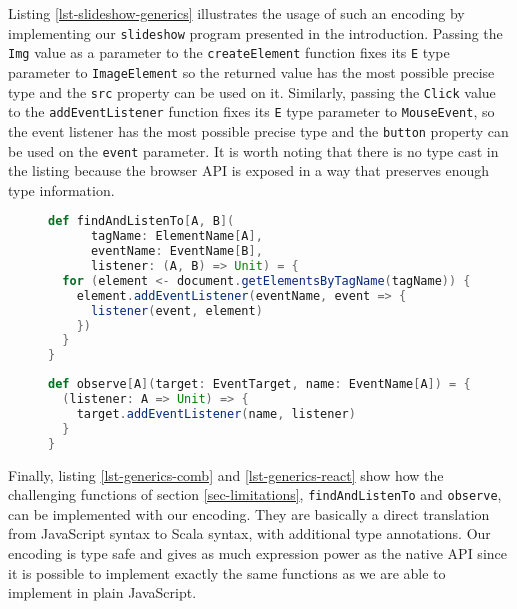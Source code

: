 \documentclass{llncs}
\newcommand{\jscode}[1]{\lstinline[language=JavaScript]|#1|}
\newcommand{\scalacode}[1]{\lstinline[language=Scala]|#1|}
\begin{document}
Listing \ref{lst-slideshow-generics} illustrates the usage of such an encoding by implementing our \texttt{slideshow} program presented in the introduction. Passing the \scalacode{Img} value as a parameter to the \scalacode{createElement} function fixes its \scalacode{E} type parameter to \scalacode{ImageElement} so the returned value has the most possible precise type and the \scalacode{src} property can be used on it. Similarly, passing the \scalacode{Click} value to the \scalacode{addEventListener} function fixes its \scalacode{E} type parameter to \scalacode{MouseEvent}, so the event listener has the most possible precise type and the \scalacode{button} property can be used on the \scalacode{event} parameter. It is worth noting that there is no type cast in the listing because the browser API is exposed in a way that preserves enough type information.

\begin{figure}
\begin{lstlisting}[label=lst-generics-comb,language=Scala,caption={Combination of \scalacode{getElementsByTagName} and \scalacode{addEventListener} functions encoded using type parameters}]
def findAndListenTo[A, B](
      tagName: ElementName[A],
      eventName: EventName[B],
      listener: (A, B) => Unit) = {
  for (element <- document.getElementsByTagName(tagName)) {
    element.addEventListener(eventName, event => {
      listener(event, element)
    })
  }
}
\end{lstlisting}
\end{figure}

\begin{figure}
\begin{lstlisting}[label=lst-generics-react,language=Scala,caption={Partial application of \scalacode{addEventListener} encoded with type parameters}]
def observe[A](target: EventTarget, name: EventName[A]) = {
  (listener: A => Unit) => {
    target.addEventListener(name, listener)
  }
}
\end{lstlisting}
\end{figure}

Finally, listing \ref{lst-generics-comb} and \ref{lst-generics-react} show how the challenging functions of section \ref{sec-limitations}, \jscode{findAndListenTo} and \jscode{observe}, can be implemented with our encoding. They are basically a direct translation from JavaScript syntax to Scala syntax, with additional type annotations. Our encoding is type safe and gives as much expression power as the native API since it is possible to implement exactly the same functions as we are able to implement in plain JavaScript.
\end{document}
